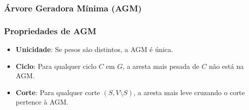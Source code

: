 \subsubsection{Árvore Geradora Mínima (AGM)}
\subsubsection*{Propriedades de AGM}
\begin{itemize}
\item \textbf{Unicidade}: Se pesos são distintos, a AGM é única.
\item \textbf{Ciclo}: Para qualquer ciclo $C$ em $G$, a aresta mais pesada de $C$ não está na AGM.
\item \textbf{Corte}: Para qualquer corte $(S, V\setminus S)$, a aresta mais leve cruzando o corte pertence à AGM.
\end{itemize}